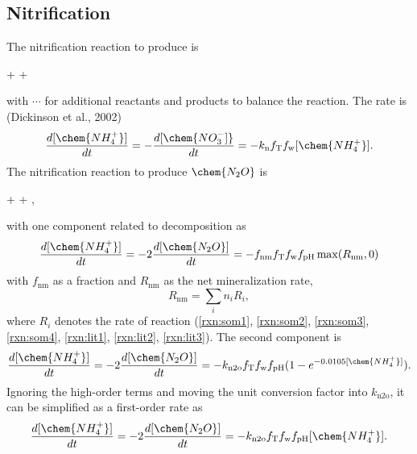 \documentclass[gmd, manuscript]{copernicus}
\begin{document}
\subsection{Nitrification}
The nitrification reaction to produce  is 
\begin{reaction}
 + \cdots \rightarrow {} + \cdots
\label{rxn:nitr2no3}
\end{reaction}
with $\cdots$ for additional reactants and products to balance the reaction. The
rate is (Dickinson et al., 2002) 
\begin{equation}
\frac{d [\chem{NH_4^+}]}{d t} = -\frac{d
[\chem{NO_3^-]}}{d t} = -k_\text{n} f_\text{T} f_\text{w}
[\chem{NH_4^+}].
\label{eq:nitr2no3}
\end{equation}
The nitrification reaction to produce $\chem{N_2O}$ is
\begin{reaction}
 + \cdots {}  + \cdots,
\label{rxn:nitr2n2o}
\end{reaction}
with one component related to decomposition as %
\begin{equation}
\frac{d [\chem{NH_4^+}]}{d t} = -2\frac{d
[\chem{N_2O}]}{d t} = -f_\text{nm} f_\text{T} f_\text{w}
f_\text{pH}\max(R_\text{nm},0)
\label{eq:nitr2n2odecomp}
\end{equation}
with $f_\text{nm}$ as a fraction \citep{Parton1996} and $R_\text{nm}$ as the
net  mineralization rate,  
\begin{equation}
R_\text{nm}=\sum_{i} n_iR_i,
\label{eq:netnmin}
\end{equation}
where $R_i$ denotes the rate of reaction (\ref{rxn:som1}, \ref{rxn:som2},
\ref{rxn:som3}, \ref{rxn:som4}, \ref{rxn:lit1}, \ref{rxn:lit2},
\ref{rxn:lit3}).
The second component is \citep{Parton1996} %
\begin{equation} 
\frac{d [\chem{NH_4^+}]}{d t} = -2\frac{d
[\chem{N_2O}]}{d t} = -k_\text{n2o} f_\text{T} f_\text{w}
f_\text{pH}(1-e^{-0.0105[\chem{NH_4^+}]}).
\label{eq:nitr2n2oexess}
\end{equation}
Ignoring the high-order terms and moving the unit conversion factor into
$k_\text{n2o}$, it can be simplified as a first-order
rate as
\begin{equation} 
\frac{d [\chem{NH_4^+}]}{d t} = -2\frac{d
[\chem{N_2O}]}{d t} = -k_\text{n2o} f_\text{T} f_\text{w}
f_\text{pH}[\chem{NH_4^+}].
\label{eq:nitr2n2oexesssimple}
\end{equation}
\end{document}

